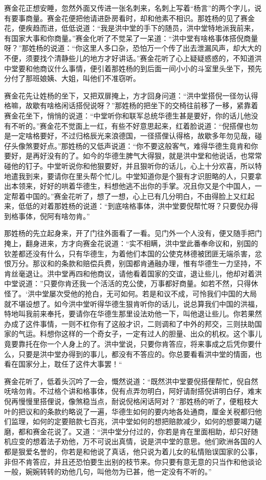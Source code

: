 \documentclass[12pt,UTF8]{ctexbook}
\begin{document}
{{{赛金花正想安睡，忽然外面又传进一张名刺来，名刺上写着“杨言”的两个字儿，说有要事商量。赛金花便把他请进卧房看时，却和他素不相识。那姓杨的见了赛金花，便疾趋而进，低低说道：“我是洪中堂的手下的随员，洪中堂特地派我前来，有国家大事和你商量。”赛金化听了不觉呆了一呆道：“洪中堂有啥格事体搭倪商量呀？”那姓杨的说道：“你这里人多口杂，恐怕万一个传了出去泄漏风声，却大大的不便，须要找个清静些儿的地方才好讲话。”赛金花听了心上疑疑惑惑的，不知道洪中堂要和他商议什么事情，便引着那姓杨的到后面一间小小的斗室里头坐下，预先分付了那班娘姨、大姐，叫他们不准窃听。

赛金花先让姓杨的坐下，又把双扉掩上，方才回身问道：“洪中堂搭倪一径勿认得格嘛，故歇有啥格闲话搭倪说呀？”那姓杨的把坐下的交椅往前移了一移，紧靠着赛金花坐下，悄悄的说道：“中堂听你和联军总统华德生甚是要好，你的话儿他没有不听的。”赛金花不觉面上一红，有些不好意思起来，红着脸说道：“倪搭俚也勿是一定啥格要好，不过归格辰光来浪德国，一径搭俚认得格，故歇多年勿见哉，碰仔头像煞要好点。”那姓杨的又低声说道：“你不要这般客气，难得华德生竟肯和你要好，是再好没有的了。如今的华德生脾气大得狠，就是洪中堂和他说话，也常常碰他的钉子。中堂听说你和他狠要好，并且狠听你的话儿，心上十分欢喜，所以特地遣我到来，要请你在里头帮个忙儿。中堂知道你是个狠有才识胆略的人，只要拿出本领来，好好的哄着华德生，料想他逃不出你的手掌。况且你又是个中国人，一定帮着中国的。”赛金花听了，想了一想，心上已有几分明白，不由得脸上又红起来，低低的对着那姓杨的说道：“到底啥格事体，洪中堂要倪帮忙呀？只要倪办得到格事体，倪阿有啥勿肯。”

那姓杨的先立起身来，开了门往外面看了一看。见门外一个人没有，便又随手把门掩上，翻身进来，方才向赛金花说道：“实不相瞒，洪中堂此番奉命议和，别国的钦差都还没有什么，只有华德生，为着他们本国的公使克林德被团匪无端杀害，忿恨万分。那议和的条款和赔偿兵费，别国都肯通融办理，惟有华德生一力坚持，不肯丝毫退让。洪中堂再四和他商议，请他看着国家的交谊，退让些儿，他却对着洪中堂说道：”只要你肯还我一个活活的克公使，万事都好商量。如若不然，只得休怪了。‘洪中堂屡次受他的抢白，无可如何。若是和议不成，可怜我们中国的大局就不堪设想了。如今洪中堂听得华德生狠肯听你的话儿，说总算我们中国的洪福，特地叫我前来奉托，要请你在华德生那里设法劝他一下，叫他退让些儿。你若果然办成了这件事情，一则不杠你有了这般才识，二则调和了中外的邦交，三则扶助国家的气运。料想你这样的一个奇女子，一定有过人的胆量、出众的机权。这个事儿竟要靠托在你一个人身上的了。洪中堂说，只要你肯答应，将来事成之后凭你要什么，只要是洪中堂办得到的事儿，都没有不答应的。你总要看看洪中堂的情面，也看在国家分上，耽任了这件大事罢！“

赛金花听了，低着头沉吟了一会，慨然说道：“既然洪中堂要倪搭俚帮忙，倪自然呒啥勿肯。不过格个讲和格事体，倪有点弄勿明白，阿好请耐搭倪讲明白仔，难末倪再慢慢里搭俚说，像煞稳当点，耐说倪格闲话阿对？”那姓杨的听了，便粗枝大叶的把议和的条款约略说了一遍，华德生如何的要内地各处通商，厘金关税都归他们监理，如何的定要赔款七百兆，洪中堂如何的想把赔款减少，如何的想要竭力磋磨，都和赛金花说了。又道：“洪中堂分付过的，你若是肯在里面相助，却只好随机应变的想着法子劝他，万不可说出真情，说是洪中堂的意思。他们欧洲各国的人都是狠爱名誉的，你若是和他说了真话，他只说为着儿女的私情贻误国家的公事，非但不肯答应，并且还恐怕要生出别的枝节来。你只要有意无意的只当作和他谈论一般，婉婉转转的劝他几句，叫他勿为已甚，他一定没有不听的。”

}}}
\end{document}
